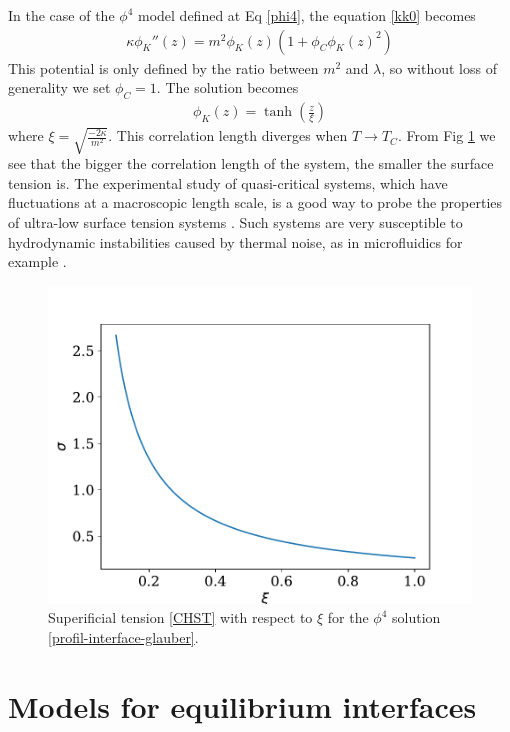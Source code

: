 In the case of the $\phi^4$ model defined at Eq \eqref{phi4}, the equation \eqref{kk0} becomes
\begin{align}
\kappa \phi_K''(z) = m^2 \phi_K(z) \left( 1 + \phi_C \phi_K(z) ^2 \right)
\label{eq-interface-glauber}
\end{align}
This potential is only defined by the ratio between $m^2$ and $\lambda$, so without loss of generality we set $\phi_C = 1$. The solution becomes
\begin{align}
\phi_K(z) = \tanh \left( \frac{z}{\xi} \right)
\label{profil-interface-glauber} 
\end{align}
where $\xi = \sqrt{\frac{-2 \kappa}{m^2}}$. This correlation length diverges when $T\to T_C$.
From Fig \ref{tension-xi} we see that the bigger the correlation length of the system, the smaller the surface tension is. The experimental study of quasi-critical systems, which have fluctuations at a macroscopic length scale, is a good way to probe the properties of ultra-low surface tension systems \cite{hennequin_drop_2006}. Such systems are very susceptible to hydrodynamic instabilities caused by thermal noise, as in microfluidics for example \cite{atencia_controlled_2005}. 
\begin{figure}
\centering
\includegraphics[width=0.7\linewidth]{int-dyn/tension-superficielle.pdf}
\caption{Superificial tension \eqref{CHST} with respect to $\xi$ for the $\phi^4$ solution \eqref{profil-interface-glauber}.}
\label{tension-xi}
\end{figure}


\section{Models for equilibrium interfaces}
\label{sec-continuous}

